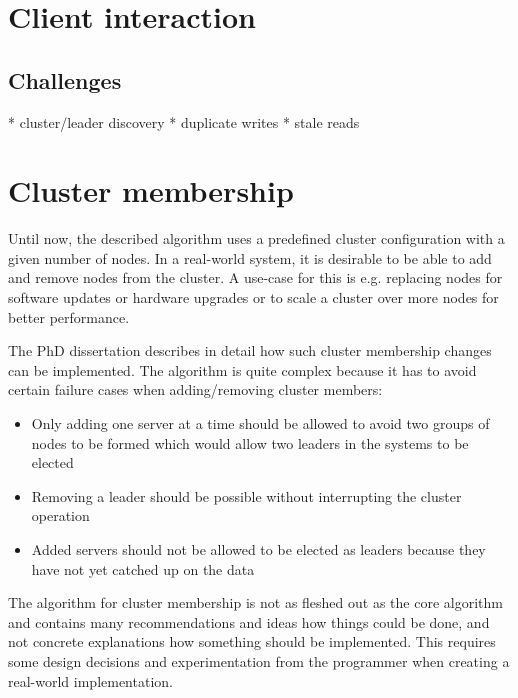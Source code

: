 \section{Client interaction}



\subsection{Challenges}
* cluster/leader discovery
* duplicate writes
* stale reads







\section{Cluster membership}
Until now, the described algorithm uses a predefined cluster configuration with a given number of nodes. In a real-world system, it is desirable to
be able to add and remove nodes from the cluster. A use-case for this is e.g. replacing nodes for software updates or hardware upgrades or to
scale a cluster over more nodes for better performance.

The PhD dissertation \cite{raft_phd_thesis} describes in detail how such cluster membership changes can be implemented.
The algorithm is quite complex because it has to avoid certain failure cases when adding/removing cluster members:

\begin{itemize}
    \item Only adding one server at a time should be allowed to avoid two groups of nodes to be formed which would allow two leaders in the systems to be elected
    \item Removing a leader should be possible without interrupting the cluster operation
    \item Added servers should not be allowed to be elected as leaders because they have not yet catched up on the data
\end{itemize}

The algorithm for cluster membership is not as fleshed out as the core algorithm and contains many recommendations and ideas how things could be done, and not 
concrete explanations how something should be implemented. This requires some design decisions and experimentation from the programmer when creating a real-world implementation.











